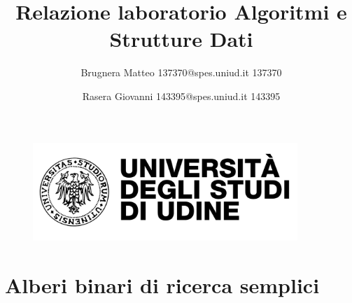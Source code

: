 \documentclass[a4paper]{article}
\begin{document}
		\title{Relazione laboratorio Algoritmi e Strutture Dati}
		\maketitle
		
		\begin{flushleft}
			\author{Brugnera Matteo 137370@spes.uniud.it 137370}
			\newline
			\author{Rasera Giovanni 143395@spes.uniud.it 143395}
		\end{flushleft}
		
		\begin{figure}[ht]
			\centering
			\includegraphics[width=10cm]{Udine}
			\label{Udine}
		\end{figure}
		
		\tableofcontents
		\newpage
		
		\section{Alberi binari di ricerca semplici}
\end{document}
